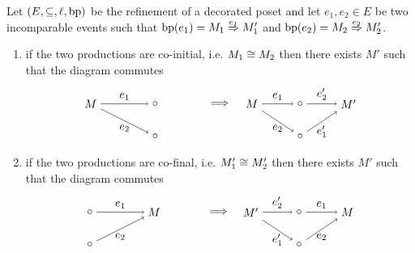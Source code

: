 \begin{lemma}
  \label{lem:rewrite_concurrent}
  Let $(E,\subseteq,\ell, \operatorname{bp}) $ be the refinement of a decorated poset and let $e_1,e_2\in E$ be two incomparable events such that
  $\operatorname{bp}(e_1) = M_1\overset{e_1}{\Rightarrow} M_1'$ and $\operatorname{bp}(e_2) = M_2\overset{e_2}{\Rightarrow} M_2'$.
  \begin{enumerate}
  \item if the two productions are co-initial, i.e. $M_1\cong M_2$ then there exists $M'$ such that the diagram commutes
  \[
  \begin{tikzpicture} %
    \node (m2) at (0,0) {\(\circ\)};
    \node (m1) at (0,1) {\(\circ\)};
    \node (m) at (-2,1) {\(M\)};
    \node (implies) at (2,1) {\(\implies\)};
    \node (mm2) at (4.5,0) {\(\circ\)};
    \node (mm1) at (4.5,1) {\(\circ\)};
    \node (n) at (6,1) {\(M'\)};
    \node (mm) at (3,1) {\(M\)};
    \draw [->] (m) -- node [left,above] {\(e_1\)} (m1);
    \draw [->] (m) -- node [left,below] {\(e_2\)} (m2);
    \draw [->] (mm) -- node [left,above] {\(e_1\)} (mm1);
    \draw [->] (mm) -- node [left,below] {\(e_2\)} (mm2);
    \draw [->] (mm1) -- node [left,above] {\(e_2'\)} (n);
    \draw [->] (mm2) -- node [left,below] {\(e_1'\)} (n);
  \end{tikzpicture}
  \]

  \item if the two productions are co-final, i.e. $M_1'\cong M_2'$ then there exists $M'$ such that the diagram commutes
  \[
  \begin{tikzpicture} %
    \node (m2) at (-2,0) {\(\circ\)};
    \node (m1) at (-2,1) {\(\circ\)};
    \node (m) at (0,1) {\(M\)};
    \node (implies) at (2,1) {\(\implies\)};
    \node (mm2) at (4.5,0) {\(\circ\)};
    \node (mm1) at (4.5,1) {\(\circ\)};
    \node (n) at (3,1) {\(M'\)};
    \node (mm) at (6,1) {\(M\)};
    \draw [->] (m1) -- node [left,above] {\(e_1\)} (m);
    \draw [->] (m2) -- node [left,below] {\(e_2\)} (m);
    \draw [->] (mm1) -- node [left,above] {\(e_1\)} (mm);
    \draw [->] (mm2) -- node [left,below] {\(e_2\)} (mm);
    \draw [->] (n) -- node [left,above] {\(e_2'\)} (mm1);
    \draw [->] (n) -- node [left,below] {\(e_1'\)} (mm2);
  \end{tikzpicture}
  \]
  \end{enumerate}
\end{lemma}

